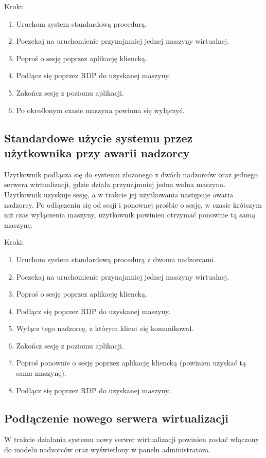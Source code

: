 \documentclass[../analiza-rozwiazania.tex]{subfiles}
\begin{document}
Kroki:
\begin{enumerate}
  \item Uruchom system standardową procedurą.
  \item Poczekaj na uruchomienie przynajmniej jednej maszyny wirtualnej.
  \item Poproś o sesję poprzez aplikację kliencką.
  \item Podłącz się poprzez RDP do uzyskanej maszyny.
  \item Zakończ sesję z poziomu aplikacji.
  \item Po określonym czasie maszyna powinna się wyłączyć.
\end{enumerate}

\subsection{Standardowe użycie systemu przez użytkownika przy awarii nadzorcy}
Użytkownik podłącza się do systemu złożonego z dwóch nadzorców oraz jednego serwera wirtualizacji, gdzie działa przynajmniej jedna wolna maszyna.
Użytkownik uzyskuje sesję, a w trakcie jej użytkowania następuje awaria nadzorcy.
Po odłączeniu się od sesji i ponownej prośbie o sesję, w czasie krótszym niż czas wyłączenia maszyny, użytkownik powinien otrzymać ponownie tą samą maszynę.

Kroki:
\begin{enumerate}
  \item Uruchom system standardową procedurą z dwoma nadzorcami.
  \item Poczekaj na uruchomienie przynajmniej jednej maszyny wirtualnej.
  \item Poproś o sesję poprzez aplikację kliencką.
  \item Podłącz się poprzez RDP do uzyskanej maszyny.
  \item Wyłącz tego nadzorcę, z którym klient się komunikował.
  \item Zakończ sesję z poziomu aplikacji.
  \item Poproś ponownie o sesję poprzez aplikację kliencką (powinien uzyskać tą sama maszynę).
  \item Podłącz się poprzez RDP do uzyskanej maszyny.
\end{enumerate}

\subsection{Podłączenie nowego serwera wirtualizacji}
W trakcie działania systemu nowy serwer wirtualizacji powinien zostać włączony do modelu nadzorców oraz wyświetlony w panelu administratora.
\end{document}
